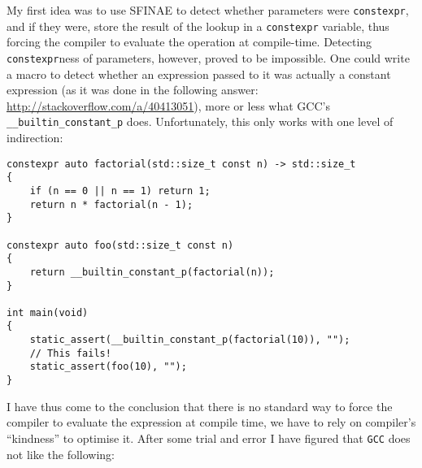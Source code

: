 \documentclass[a4paper,12pt]{article}
\begin{document}
    My first idea was to use SFINAE to detect whether parameters were \texttt{constexpr}, and if they were, store the result of the lookup in a \texttt{constexpr} variable, thus forcing the compiler to evaluate the operation at compile-time. Detecting \texttt{constexpr}ness of parameters, however, proved to be impossible. One could write a macro to detect whether an expression passed to it was actually a constant expression (as it was done in the following answer: \url{http://stackoverflow.com/a/40413051}), more or less what GCC's \texttt{\_\_builtin\_constant\_p} does. Unfortunately, this only works with one level of indirection:
    \begin{spacing}{0.8}
\begin{lstlisting}
constexpr auto factorial(std::size_t const n) -> std::size_t
{
	if (n == 0 || n == 1) return 1;
	return n * factorial(n - 1);
}

constexpr auto foo(std::size_t const n)
{
	return __builtin_constant_p(factorial(n));
}

int main(void)
{
	static_assert(__builtin_constant_p(factorial(10)), "");
	// This fails!
	static_assert(foo(10), "");
}
\end{lstlisting}
    \end{spacing}
    I have thus come to the conclusion that there is no standard way to force the compiler to evaluate the expression at compile time, we have to rely on compiler's ``kindness'' to optimise it. After some trial and error I have figured that \texttt{GCC} does not like the following:
\end{document}
